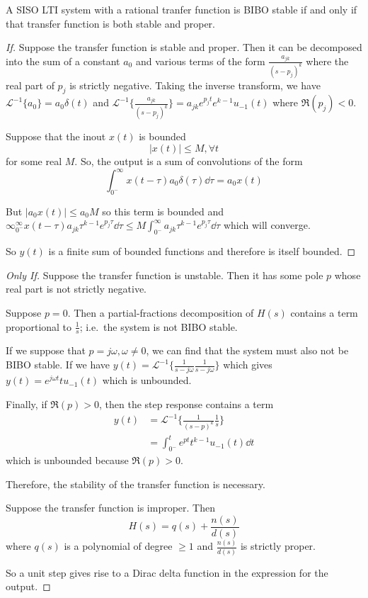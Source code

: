 \documentclass[12pt]{article}
\begin{document}
\begin{theorem}
A SISO LTI system with a rational tranfer function is BIBO stable if and only if that transfer function is both stable and proper.
\end{theorem}

\begin{proof}[If]
Suppose the transfer function is stable and proper. Then it can be decomposed into the sum of a constant $a_0$ and various terms of the form $\frac{a_{jk}}{{(s-p_j)}^k}$ where the real part of $p_j$ is strictly negative. Taking the inverse transform, we have $\mathcal{L}^{-1} \{ a_0 \} = a_0 \delta(t)$ and $\mathcal{L}^{-1} \{ \frac{a_{jk}}{{(s-p_j)}^k} \} = a_{jk} e^{p_j t} e^{k-1} u_{-1}(t)$ where $\Re (p_j) < 0$.

Suppose that the inout $x(t)$ is bounded \[ |x(t)| \leq M, \forall t \] for some real $M$. So, the output is a sum of convolutions of the form \[ \int_{0^-}^\infty x(t-\tau) a_0 \delta(\tau) \dd\tau = a_0 x(t) \]

But $|a_0 x(t)| \leq a_0 M$ so this term is bounded and $\infty_{0^-}^\infty x(t-\tau) a_{jk} \tau^{k-1} e^{p_j \tau} \dd\tau \leq M \int_{0^-}^\infty a_{jk} \tau^{k-1} e^{p_j \tau} \dd\tau$ which will converge.

So $y(t)$ is a finite sum of bounded functions and therefore is itself bounded.
\end{proof}

\begin{proof}[Only If]
Suppose the transfer function is unstable. Then it has some pole $p$ whose real part is not strictly negative.

Suppose $p=0$. Then a partial-fractions decomposition of $H(s)$ contains a term proportional to $\frac{1}{s}$; i.e.\ the system is not BIBO stable.

If we suppose that $p = j\omega, \omega \neq 0$, we can find that the system must also not be BIBO stable. If we have $y(t) = \mathcal{L}^{-1} \{ \frac{1}{s-j\omega}\frac{1}{s-j\omega} \}$ which gives $y(t) = e^{j\omega t} tu_{-1}(t)$ which is unbounded.

Finally, if $\Re(p) > 0$, then the step response contains a term
\begin{align*}
y(t) &= \mathcal{L}^{-1} \{ \frac{1}{{(s-p)}^k} \frac{1}{s} \}\\
&= \int_{0^-}^t e^{pt} t^{k-1} u_{-1}(t) \dd t
\end{align*}
which is unbounded because $\Re(p) > 0$.

Therefore, the stability of the transfer function is necessary.

Suppose the transfer function is improper. Then \[ H(s) = q(s) + \frac{n(s)}{d(s)} \] where $q(s)$ is a polynomial of degree $\geq 1$ and $\frac{n(s)}{d(s)}$ is strictly proper.

So a unit step gives rise to a Dirac delta function in the expression for the output.
\end{proof}
\end{document}
